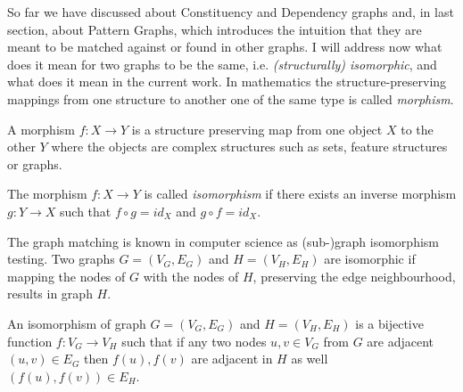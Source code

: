 So far we have discussed about Constituency and Dependency graphs and, in last section, about Pattern Graphs, which introduces the intuition that they are meant to be matched against or found in other graphs. I will address now what does it mean for two graphs to be the same, i.e. \textit{(structurally) isomorphic}, and what does it mean in the current work. In mathematics the structure-preserving mappings from one structure to another one of the same type is called \textit{morphism}. 

\begin{definition}[Morphism]\label{def:morphism}
    A morphism $f:X \rightarrow Y$ is a structure preserving map from one object $X$ to the other $Y$ where the objects are complex structures such as sets, feature structures or graphs.
\end{definition}



\begin{definition}[Isomorphism]\label{def:isomorphism}
    The morphism $f:X \rightarrow Y$ is called \textit{isomorphism} if there exists an inverse morphism $g:Y \rightarrow X$ such that $f \circ g = id_{X}$ and $ g \circ f = id_{X}$.
\end{definition}

The graph matching is known in computer science as (sub-)graph isomorphism testing. Two graphs $G=(V_G,E_G)$ and $H=(V_H,E_H)$ are isomorphic if mapping the nodes of $G$ with the nodes of $H$, preserving the edge neighbourhood, results in graph $H$. 

\begin{definition}\label{def:gisomorphism}
    An isomorphism of graph $G=(V_G,E_G)$ and $H=(V_H,E_H)$ is a bijective function $f:V_G \rightarrow V_H$ such that if any two nodes  $u,v \in V_G$ from $G$ are adjacent $(u,v) \in E_G$ then $f(u), f(v)$ are adjacent in $H$ as well $(f(u), f(v)) \in E_H $.
\end{definition}


